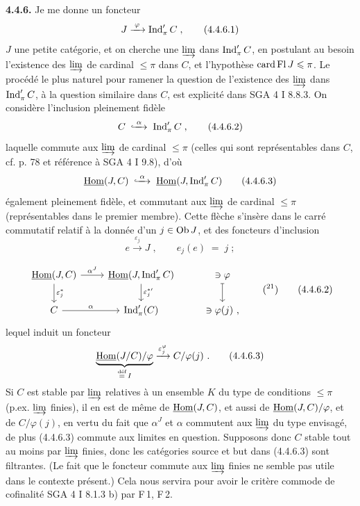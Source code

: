 \textbf{4.4.6.} Je me donne un foncteur %
\[
J \xrightarrow{\;\varphi\;} \operatorname{Ind}'_\pi C \;, \tag*{(4.4.6.1)}
\]
$J$ une petite catégorie, et on cherche une $\varinjlim$ dans $\operatorname{Ind}'_\pi C$, en postulant au besoin l'existence des $\varinjlim$ de cardinal $\leqslant \pi$ dans $C$, et l'hypothèse $\operatorname{card}\operatorname{Fl} J \leqslant \pi$. Le procédé le plus naturel pour ramener la question de l'existence des $\varinjlim$ dans $\operatorname{Ind}'_\pi C$, à la question similaire dans $C$, est explicité dans SGA 4 I 8.8.3. On considère l'inclusion pleinement fidèle
\[
C \;\hookxrightarrow{\;\alpha\;}\; \Ind'_\pi C \;, \tag*{(4.4.6.2)}
\]
laquelle commute aux $\varinjlim$ de cardinal $\leqslant \pi$ (celles qui sont représentables dans $C$, cf. p. 78 et référence à SGA 4 I 9.8), d'où
\[
\uHom(J,C) \;\hookxrightarrow{\;\alpha\;}\; \uHom(J,\Ind'_\pi C) \tag*{(4.4.6.3)}
\]
également pleinement fidèle, et commutant aux $\varinjlim$ de cardinal $\leqslant \pi$ (représentables dans le premier membre). Cette flèche s'insère dans le carré commutatif relatif à la donnée d'un $j \in \mathrm{Ob}\, J$, et des foncteurs d'inclusion
\[
e \xrightarrow{\;\varepsilon_j\;} J \;, \qquad e_j(e) \;=\; j \;; \tag*{(4.4.6.4)} %
\]


\[
\begin{tikzcd}
\uHom(J,C) \arrow[r, "\alpha^J"] \arrow[d, "\varepsilon_j^*"] & \uHom(J,\Ind'_\pi C) \arrow[d, "{\varepsilon_j^{*\prime}}"] & \ni \varphi \arrow[d, mapsto] \\
C \arrow[r, "\alpha"] & \Ind'_\pi(C) & \ni \varphi(j)\ ,
\end{tikzcd}
\qquad (\text{\footnotemark[21]})
\tag*{(4.4.6.2)}
\]
lequel induit un foncteur
\[
\underbrace{\uHom(J/C)/\varphi}_{\overset{\text{déf}}{=}\, I} \xrightarrow{\varepsilon_j^\varphi} C/\varphi(j)\ . \tag*{(4.4.6.3)} %
\]
Si $C$ est stable par $\varinjlim$ relatives à un ensemble $K$ du type de conditions $\leqslant \pi$ (p.ex. $\varinjlim$ finies), il en est de même de $\underline{\mathrm{Hom}}(J,C)$, et aussi de $\underline{\mathrm{Hom}}(J,C)/\varphi$, et de $C/\varphi(j)$, en vertu du fait que $\alpha^J$ et $\alpha$ commutent aux $\varinjlim$ du type envisagé, de plus (4.4.6.3) commute aux limites en question. Supposons donc $C$ stable tout au moins par $\varinjlim$ finies, donc les catégories source et but dans (4.4.6.3) sont filtrantes. (Le fait que le foncteur commute aux $\varinjlim$ finies ne semble pas utile dans le contexte présent.) Cela nous servira pour avoir le critère commode de cofinalité SGA 4 I 8.1.3 b) par F\,1, F\,2.

